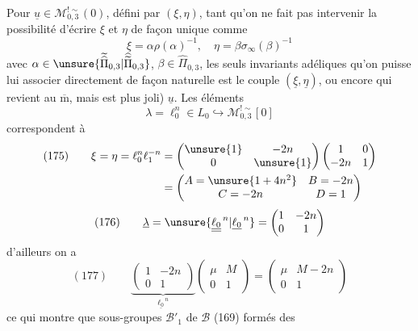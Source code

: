 Pour $\underline u\in\mathcal M_{0,3}^{!\sim}(0)$, défini par
$(\xi,\eta)$, tant qu'on ne fait pas intervenir la
possibilité d'écrire $\xi$ et $\eta$ de façon unique comme
\[
\xi=\alpha\rho(\alpha)^{-1},\quad
\eta=\beta\sigma_\infty(\beta)^{-1}
\]
avec $\alpha\in\unsure{\widetilde{\widehat\Pi}_{0,3}|\widehat{\widetilde\Pi}_{0,3}}$,
$\beta\in\widehat\Pi_{0,3}$, les seuls invariants adéliques qu'on
puisse lui associer directement de façon naturelle est le couple
$(\underline\xi,\underline\eta)$, ou encore  qui revient au
$\overline{\mathrm m}$, mais est plus joli) $\underline u$.
Les éléments 
\[
\lambda=\ell_0^n\in L_0\hookrightarrow\mathcal M_{0,3}^{!\sim}[0]
\]
correspondent à
\[
\begin{aligned}
(175)\qquad
\xi=\eta=\ell_0^n\ell_1^{-n}
&=\begin{pmatrix}\unsure{1}&-2n\\0&\unsure{1}\end{pmatrix}
\begin{pmatrix}1&0\\-2n&1\end{pmatrix}\\
&=\begin{pmatrix}A=\unsure{1+4n^2}&B=-2n\\C=-2n&D=1\end{pmatrix}
\end{aligned}
\]
\[
(176)\qquad
\underline\lambda=\unsure{\underline{\underline{\ell_0}}^{\,n}|\underline{\ell_0}^{\,n}}
=\begin{pmatrix}1&-2n\\0&1\end{pmatrix}
\]
d'ailleurs on a
\[
(177)\qquad
\underbrace{\begin{pmatrix}1&-2n\\0&1\end{pmatrix}}_{\underline{\ell_0}^{\,n}}
\begin{pmatrix}\mu&M\\0&1\end{pmatrix}
=\begin{pmatrix}\mu&M-2n\\0&1\end{pmatrix}
\]
ce qui montre que 
sous-groupes $\mathcal B'_1$ de $\mathcal B$ (169) formés des
